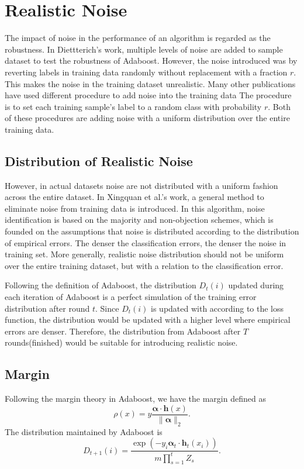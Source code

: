 \section{Realistic Noise}
The impact of noise in the performance of an algorithm is regarded as the robustness.
In Diettterich’s work\cite{dietterich2000experimental}, multiple levels of noise are added to sample dataset to test the robustness of Adaboost.
However, the noise introduced was by reverting labels in training data randomly without replacement with a fraction $r$.
This makes the noise in the training dataset unrealistic.
Many other publications have used different procedure to add noise into the training data
The procedure is to set each training sample’s label to a random class with probability $r$.
Both of these procedures are adding noise with a uniform distribution over the entire training data.

\subsection{Distribution of Realistic Noise}
However, in actual datasets noise are not distributed with a uniform fashion across the entire dataset.
In Xingquan et al.’s work\cite{zhu2003eliminating}, a general method to eliminate noise from training data is introduced.
In this algorithm, noise identification is based on the majority and non-objection schemes,
which is founded on the assumptions that noise is distributed according to the distribution of empirical errors.
The denser the classification errors, the denser the noise in training set.
More generally, realistic noise distribution should not be uniform over the entire training dataset, but with a relation to the classification error.

Following the definition of Adaboost, the distribution $D_t(i)$ updated during each iteration of Adaboost is a perfect simulation of the training error distribution after round $t$.
Since $D_t(i)$ is updated with according to the loss function, the distribution would be updated with a higher level where empirical errors are denser.
Therefore, the distribution from Adaboost after $T$ rounds(finished) would be suitable for introducing realistic noise.

\subsection{Margin}
Following the margin theory in Adaboost, we have the margin defined as
\[\rho(x) = y \frac{ \mathbf{\alpha} \cdot \mathbf{h}(x) }{ \| \mathbf{\alpha}\|_2 }.\]
The distribution maintained by Adaboost is
\[D_{t+1}(i) = \frac{\exp( -y_i \mathbf{\alpha}_t \cdot \mathbf{h}_t (x_i) ) }{m \prod_{s=1}^t Z_s}.\]

